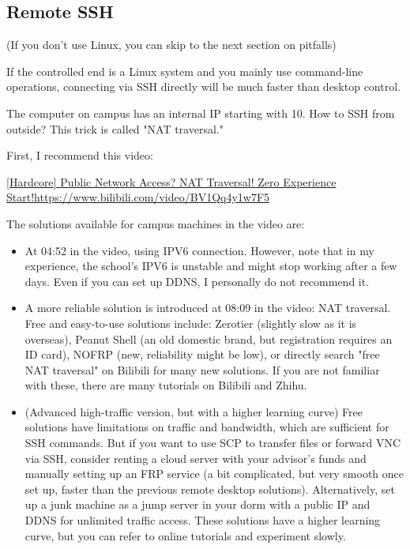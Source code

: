 \subsection{Remote SSH}
(If you don't use Linux, you can skip to the next section on pitfalls)

If the controlled end is a Linux system and you mainly use command-line operations, connecting via SSH directly will be much faster than desktop control.

The computer on campus has an internal IP starting with 10. How to SSH from outside? This trick is called "NAT traversal."

First, I recommend this video:

\href{https://www.bilibili.com/video/BV1Qq4y1w7F5}{[Hardcore] Public Network Access? NAT Traversal! Zero Experience Start!}\url{https://www.bilibili.com/video/BV1Qq4y1w7F5}

The solutions available for campus machines in the video are:
\begin{itemize}
    \item At 04:52 in the video, using IPV6 connection. However, note that in my experience, the school's IPV6 is unstable and might stop working after a few days. Even if you can set up DDNS, I personally do not recommend it.
    \item A more reliable solution is introduced at 08:09 in the video: NAT traversal. Free and easy-to-use solutions include: Zerotier (slightly slow as it is overseas), Peanut Shell (an old domestic brand, but registration requires an ID card), NOFRP (new, reliability might be low), or directly search "free NAT traversal" on Bilibili for many new solutions. If you are not familiar with these, there are many tutorials on Bilibili and Zhihu.
    \item (Advanced high-traffic version, but with a higher learning curve) Free solutions have limitations on traffic and bandwidth, which are sufficient for SSH commands. But if you want to use SCP to transfer files or forward VNC via SSH, consider renting a cloud server with your advisor's funds and manually setting up an FRP service (a bit complicated, but very smooth once set up, faster than the previous remote desktop solutions). Alternatively, set up a junk machine as a jump server in your dorm with a public IP and DDNS for unlimited traffic access. These solutions have a higher learning curve, but you can refer to online tutorials and experiment slowly.
\end{itemize}

